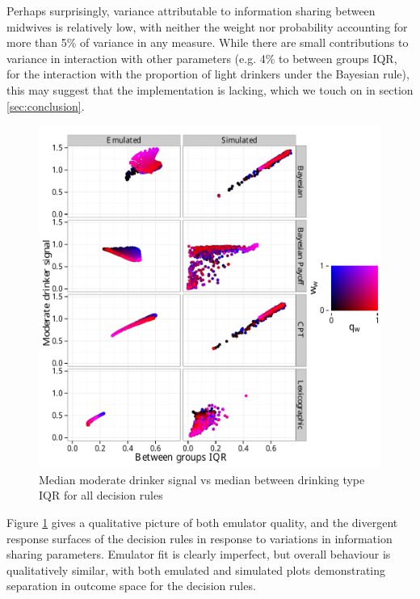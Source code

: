 Perhaps surprisingly, variance attributable to information sharing between midwives is relatively low, with neither the weight nor probability accounting for more than 5\% of variance in any measure. While there are small contributions to variance in interaction with other parameters (e.g. 4\% to between groups IQR, for the interaction with the proportion of light drinkers under the Bayesian rule), this may suggest that the implementation is lacking, which we touch on in section \ref{sec:conclusion}.

\begin{figure}[H]
\begin{adjustbox}{center}\includegraphics[width=119mm]{figures/sharing_emulated_simulated}\end{adjustbox}
\caption{Median moderate drinker signal vs median between drinking type IQR for all decision rules}
\label{fig:outcome_plots}
\end{figure}

Figure \ref{fig:outcome_plots} gives a qualitative picture of both emulator quality, and the divergent response surfaces of the decision rules in response to variations in information sharing parameters. Emulator fit is clearly imperfect, but overall behaviour is qualitatively similar, with both emulated and simulated plots demonstrating separation in outcome space for the decision rules.

